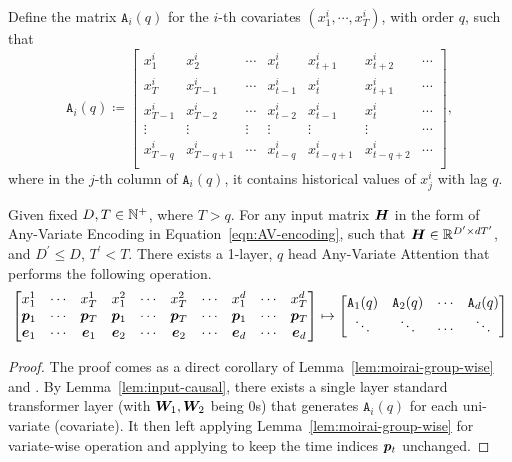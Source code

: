 \begin{lemma}
Define the matrix $\mathtt{A}_i(q)$ for the $i$-th covariates $(x_1^i, \cdots, x_T^i)$, with order $q$, such that
\begin{equation*}
    \mathtt{A}_i(q)
    \coloneqq
    \begin{bmatrix}
        x_1^i & x_2^i & \cdots & x_t^i & x_{t+1}^i & x_{t+2}^i & \cdots \\
        x_T^i & x_{T-1}^i & \cdots & x_{t-1}^i & x_t^i & x_{t+1}^i & \cdots \\
        x_{T-1}^i & x_{T-2}^i & \cdots & x_{t-2}^i & x_{t-1}^i & x_{t}^i & \cdots \\
        \vdots & \vdots & \vdots & \vdots & \vdots & \vdots & \cdots \\
        x_{T-q}^i & x_{T-q+1}^i & \cdots & x_{t-q}^i & x_{t-q+1}^i & x_{t-q+2}^i & \cdots \\   
    \end{bmatrix},
\end{equation*}
where in the $j$-th column of $\mathtt{A}_i(q)$, it contains historical values of $x_j^i$ with lag $q$.

Given fixed $D, T \in \mathbb{N}^+$, where $T > q$.
For any input matrix $\bm{H}$ in the form of Any-Variate Encoding in Equation~\ref{eqn:AV-encoding}, such that $\bm{H} \in \mathbb{R}^{ D^\prime \times dT^\prime }$, and $D^\prime \leq D$, $T^\prime < T$.
There exists a 1-layer, $q$ head Any-Variate Attention that performs the following operation.
    \begin{equation*}
    \begin{bmatrix}
        x_1^1 & \cdots & x_T^1 & x_1^2 & \cdots & x_T^2 & \cdots & x_1^d & \cdots & x_T^d
        \\
        \bm{p}_1 & \cdots & \bm{p}_T & \bm{p}_1 & \cdots & \bm{p}_T & \cdots & \bm{p}_1 & \cdots & \bm{p}_T
        \\
        \bm{e}_1 & \cdots & \bm{e}_1 & \bm{e}_2 & \cdots & \bm{e}_2 & \cdots & \bm{e}_d & \cdots & \bm{e}_d
    \end{bmatrix}
    \mapsto
    \begin{bmatrix}
        \mathtt{A}_1(q) & \mathtt{A}_2(q) & \cdots & \mathtt{A}_d(q)
        \\
        \ddots & \ddots & \cdots & \ddots 
    \end{bmatrix}
    \end{equation*}
\end{lemma}

\begin{proof}
    The proof comes as a direct corollary of Lemma~\ref{lem:moirai-group-wise} and \citep[Proposition~A.5]{bai2024transformers}.
    By Lemma~\ref{lem:input-causal}, there exists a single layer standard transformer layer (with $\bm{W}_1, \bm{W}_2$ being $0$s) that generates $\mathtt{A}_i(q)$ for each uni-variate (covariate).
    It then left applying Lemma~\ref{lem:moirai-group-wise} for variate-wise operation and applying \citep[Proposition~A.5]{bai2024transformers} to keep the time indices $\bm{p}_t$ unchanged.
        
\end{proof}


